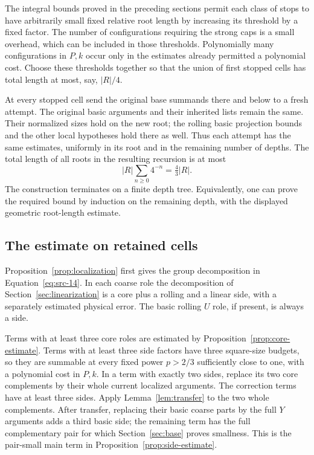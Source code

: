 The integral bounds proved in the preceding sections permit each class
of stops to have arbitrarily small fixed relative root length by
increasing its threshold by a fixed factor.  The number of configurations
requiring the strong caps is a small overhead, which can be included in
those thresholds.  Polynomially many configurations in $P,k$ occur only
in the estimates already permitted a polynomial cost.  Choose these
thresholds together so that the union of first stopped cells has total
length at most, say, $|R|/4$.

At every stopped cell send the original base summands there and below
to a fresh attempt.  The original basic arguments and their inherited
lists remain the same.  Their normalized sizes hold on the new root;
the rolling basic projection bounds and the other local hypotheses hold
there as well.  Thus each attempt has the same estimates, uniformly in
its root and in the remaining number of depths.  The total length of
all roots in the resulting recursion is at most
\[
 |R|\sum_{n\ge0}4^{-n}=\tfrac43|R|.
\]
The construction terminates on a finite depth tree.  Equivalently, one
can prove the required bound by induction on the remaining depth, with
the displayed geometric root-length estimate.

\subsection{The estimate on retained cells}
Proposition~\ref{prop:localization} first gives the group decomposition
in Equation~\eqref{eq:src-14}.  In each coarse role the decomposition of
Section~\ref{sec:linearization} is a core plus a rolling and a linear
side, with a separately estimated physical error.  The basic rolling
$U$ role, if present, is always a side.

Terms with at least three core roles are estimated by
Proposition~\ref{prop:core-estimate}.  Terms with at least three side
factors have three square-size budgets, so they are summable at every
fixed power $p>2/3$ sufficiently close to one, with a polynomial cost in
$P,k$.  In a term with exactly two sides, replace its two core complements
by their whole current localized arguments.  The correction terms have
at least three sides.  Apply Lemma~\ref{lem:transfer} to the two whole
complements.  After transfer, replacing their basic coarse parts by the
full $Y$ arguments adds a third basic side; the remaining term has the
full complementary pair for which Section~\ref{sec:base} proves
smallness.  This is the pair-small main term in
Proposition~\ref{prop:side-estimate}.

